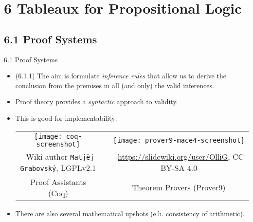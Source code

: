 \section{6 Tableaux for Propositional Logic}
\subsection{6.1 Proof Systems}

\begin{frame}{6.1 Proof Systems}

	\begin{itemize}
	
		\item (6.1.1) The aim is formulate \emph{inference rules} that allow us to derive the conclusion from the premises in all (and only) the valid inferences.

		\item Proof theory provides a \emph{syntactic} approach to validity.
				
		\item This is good for implementability:
		
		\begin{center}
			\begin{tabular}{c c c}
				
				\texttt{[image: coq-screenshot]} & &					\texttt{[image: prover9-mace4-screenshot]} \\
				{\tiny \textcopyright~Wiki author \texttt{Matj\v{e}j Grabovsk\'y}, LGPLv2.1} & &{\tiny \textcopyright~\url{https://slidewiki.org/user/OlliG}, CC BY-SA 4.0} \\[1ex]

				Proof Assistants (Coq) &\qquad & Theorem Provers (Prover9)

			\end{tabular}
		\end{center}
		
		\item There are also several mathematical upshots (e.h. consistency of arithmetic).
						
		\end{itemize}

\end{frame}

